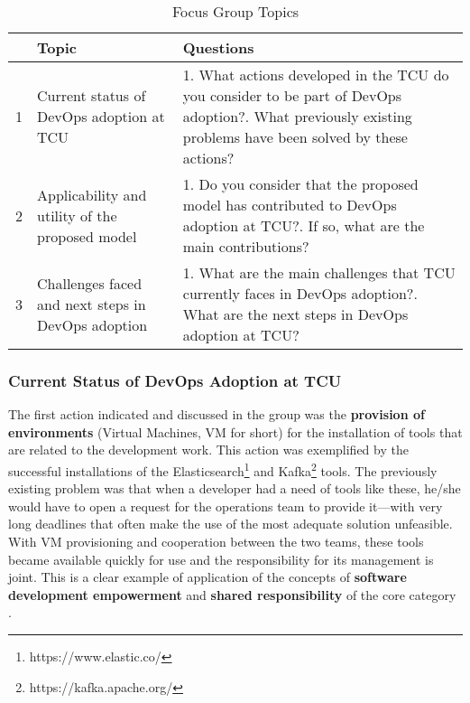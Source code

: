 \begin{table}[t]
\centering
\begin{tabular}{p{0.2cm}p{3.4cm}p{10cm}} \toprule
& \textbf{Topic} & \textbf{Questions} \\ \midrule

1 & Current status of DevOps adoption at TCU &
1. What actions developed in the TCU do you consider to be part of DevOps adoption?\newline\newline
2. What previously existing problems have been solved by these actions? \\

2 & Applicability and utility of the proposed model &
1. Do you consider that the proposed model has contributed to DevOps adoption at TCU?\newline\newline
2. If so, what are the main contributions? \\ 

3 & Challenges faced and next steps in DevOps adoption &
1. What are the main challenges that TCU currently faces in DevOps adoption?\newline\newline
2. What are the next steps in DevOps adoption at TCU?\\ \bottomrule

\end{tabular}
\caption{Focus Group Topics}
\label{table_topics}
\end{table}


\subsubsection{Current Status of DevOps Adoption at TCU}

The first action indicated and discussed in the group was the \textbf{provision of
  environments} (Virtual Machines, VM for short)
for the installation of tools that are related
to the development work. This action was exemplified by the successful
installations of the Elasticsearch\footnote{https://www.elastic.co/} and
Kafka\footnote{https://kafka.apache.org/} tools. The previously existing problem
was that when a developer had a need of tools like these,
he/she would have to open a
request for the operations team to provide it---with very long deadlines that often make
the use of the most adequate solution unfeasible. With VM provisioning and
cooperation between the two teams, these tools became available quickly for use
and the responsibility for its management is joint. This is a clear example of
application of the concepts of \textbf{software development empowerment} and
\textbf{shared responsibility} of the core category \cc.

